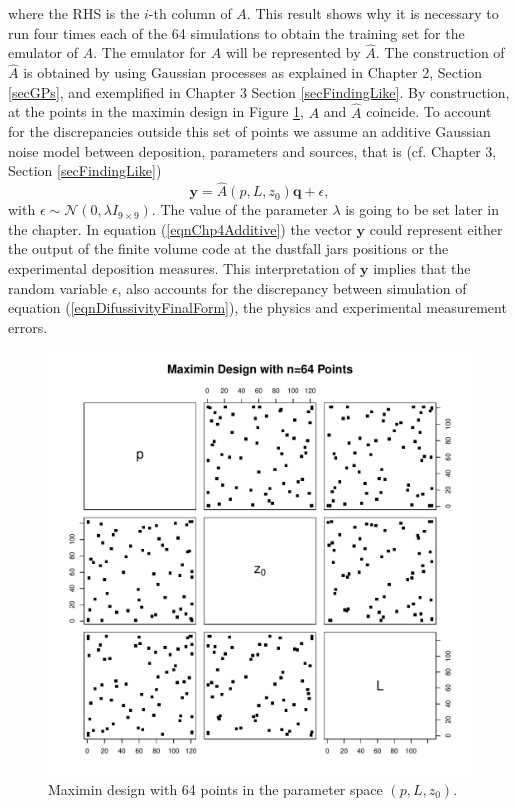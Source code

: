 \documentclass[12pt]{book}
\newcommand{\q}{\textbf{q}}
\newcommand{\y}{\textbf{y}}
\begin{document}
where the RHS is the $i$-th column of $A$. This result shows why
it is necessary to run four times each of the 64 simulations to 
obtain the training set for the emulator of $A$.
The emulator for $A$ will be represented by $\widehat{A}$. The
construction of $\widehat{A}$ is obtained by 
using Gaussian processes as explained in Chapter 2, Section \ref{secGPs}, and
exemplified in Chapter 3 Section \ref{secFindingLike}. By construction,
at the points in the maximin design in Figure \ref{figParticleSwarm}, $A$
and $\widehat{A}$ coincide. To account for the discrepancies outside this
set of points
we assume an additive Gaussian noise model between deposition, parameters
and sources, that is (cf. Chapter 3, Section \ref{secFindingLike})
\begin{equation}\label{eqnChp4Additive}
\y=\widehat{A}(p,L,z_{0})\q+\epsilon,
\end{equation} 
with $\epsilon\sim\mathcal{N}(0,\lambda I_{9\times 9})$. The value of 
the parameter $\lambda$ is going to be set later in the chapter. 
In equation (\ref{eqnChp4Additive})
the vector $\y$ could represent either the output of the finite volume 
code at the dustfall jars positions or the experimental deposition measures. 
This interpretation of $\y$ implies  that the random variable $\epsilon$, also
accounts for the discrepancy between simulation 
of equation (\ref{eqnDifussivityFinalForm}), the physics and 
experimental measurement errors.
\begin{figure}[H]
\centering
\includegraphics[scale=0.6]{./FigChap4/experimentalDesign64}
\caption{Maximin design with 64 points in the parameter space $(p,L,z_{0})$.}
\label{figParticleSwarm}
\end{figure}
\end{document}
